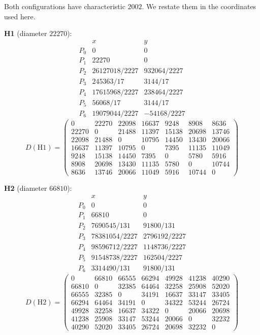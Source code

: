 \documentclass[11pt,reqno]{amsart}
\theoremstyle{plain}
\numberwithin{equation}{section}
\begin{document}
Both configurations have characteristic $2002$. We restate them in the coordinates used here.

\medskip
\noindent\textbf{H1} (diameter $22270$):
\[
\begin{array}{l|rr}
 & x & y\\\hline
P_0 & 0 & 0\\
P_1 & 22270 & 0\\
P_2 & 26127018/2227 & 932064/2227\\
P_3 & 245363/17 & 3144/17\\
P_4 & 17615968/2227 & 238464/2227\\
P_5 & 56068/17 & 3144/17\\
P_6 & 19079044/2227 & -54168/2227
\end{array}
\]
\[
D(\mathrm{H1})=
\begin{pmatrix}
    0 & 22270 & 22098 & 16637 &  9248 &  8908 &  8636\\
22270 &     0 & 21488 & 11397 & 15138 & 20698 & 13746\\
22098 & 21488 &     0 & 10795 & 14450 & 13430 & 20066\\
16637 & 11397 & 10795 &     0 &  7395 & 11135 & 11049\\
 9248 & 15138 & 14450 &  7395 &     0 &  5780 &  5916\\
 8908 & 20698 & 13430 & 11135 &  5780 &     0 & 10744\\
 8636 & 13746 & 20066 & 11049 &  5916 & 10744 &     0
\end{pmatrix}
\]

\medskip
\noindent\textbf{H2} (diameter $66810$):
\[
\begin{array}{l|rr}
 & x & y\\\hline
P_0 & 0 & 0\\
P_1 & 66810 & 0\\
P_2 & 7690545/131 & 91800/131\\
P_3 & 78381054/2227 & 2796192/2227\\
P_4 & 98596712/2227 & 1148736/2227\\
P_5 & 91548738/2227 & 162504/2227\\
P_6 & 3314490/131 & 91800/131
\end{array}
\]
\[
D(\mathrm{H2})=
\begin{pmatrix}
    0 & 66810 & 66555 & 66294 & 49928 & 41238 & 40290\\
66810 &     0 & 32385 & 64464 & 32258 & 25908 & 52020\\
66555 & 32385 &     0 & 34191 & 16637 & 33147 & 33405\\
66294 & 64464 & 34191 &     0 & 34322 & 53244 & 26724\\
49928 & 32258 & 16637 & 34322 &     0 & 20066 & 20698\\
41238 & 25908 & 33147 & 53244 & 20066 &     0 & 32232\\
40290 & 52020 & 33405 & 26724 & 20698 & 32232 &     0
\end{pmatrix}
\]
\end{document}
